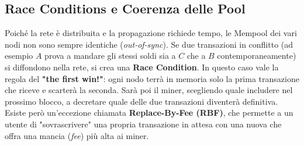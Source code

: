 \subsection{Race Conditions e Coerenza delle Pool}
Poiché la rete è distribuita e la propagazione richiede tempo, le Mempool dei vari nodi non sono sempre identiche (\textit{out-of-sync}). Se due transazioni in conflitto (ad esempio $A$ prova a mandare gli stessi soldi sia a $C$ che a $B$ contemporaneamente) si diffondono nella rete, si crea una \textbf{Race Condition}. 
In questo caso vale la regola del \textbf{"the first win!"}: ogni nodo terrà in memoria solo la prima transazione che riceve e scarterà la seconda. Sarà poi il miner, scegliendo quale includere nel prossimo blocco, a decretare quale delle due transazioni diventerà definitiva. Esiste però un'eccezione chiamata \textbf{Replace-By-Fee (RBF)}, che permette a un utente di "sovrascrivere" una propria transazione in attesa con una nuova che offra una mancia (\textit{fee}) più alta ai miner.